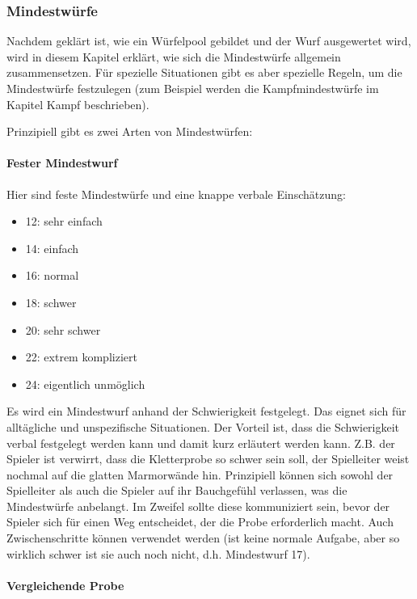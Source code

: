 \documentclass{article}
\begin{document}
\subsubsection{Mindestwürfe}

Nachdem geklärt ist, wie ein Würfelpool gebildet und der Wurf ausgewertet wird, wird in diesem Kapitel erklärt, wie
sich die Mindestwürfe allgemein zusammensetzen. Für spezielle Situationen gibt es aber spezielle Regeln, um die
Mindestwürfe festzulegen (zum Beispiel werden die Kampfmindestwürfe im Kapitel Kampf beschrieben).

Prinzipiell gibt es zwei Arten von Mindestwürfen:

\paragraph{Fester Mindestwurf}

Hier sind feste Mindestwürfe und eine knappe verbale Einschätzung:

\begin{itemize}
\item 12: sehr einfach
\item 14: einfach
\item 16: normal
\item 18: schwer
\item 20: sehr schwer
\item 22: extrem kompliziert
\item 24: eigentlich unmöglich
\end{itemize}

Es wird ein Mindestwurf anhand der Schwierigkeit festgelegt. Das eignet sich für alltägliche und unspezifische
Situationen. Der Vorteil ist, dass die Schwierigkeit verbal festgelegt werden kann und damit kurz erläutert werden
kann. Z.B. der Spieler ist verwirrt, dass die Kletterprobe so schwer sein soll, der Spielleiter weist nochmal auf die
glatten Marmorwände hin. Prinzipiell können sich sowohl der Spielleiter als auch die Spieler auf ihr Bauchgefühl
verlassen, was die Mindestwürfe anbelangt. Im Zweifel sollte diese kommuniziert sein, bevor der Spieler sich für einen
Weg entscheidet, der die Probe erforderlich macht. Auch Zwischenschritte können verwendet werden (ist keine normale
Aufgabe, aber so wirklich schwer ist sie auch noch nicht, d.h. Mindestwurf 17).

\paragraph{Vergleichende Probe}
\end{document}
